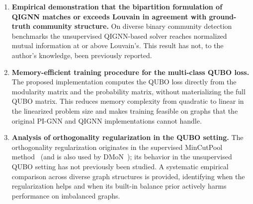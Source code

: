 \begin{enumerate}
    \item \textbf{Empirical demonstration that the bipartition
    formulation of QIGNN matches or exceeds Louvain in agreement
    with ground-truth community structure.} On diverse binary
    community detection benchmarks the unsupervised QIGNN-based
    solver reaches normalized mutual information at or above
    Louvain's. This result has not, to the author's knowledge,
    been previously reported.

    \item \textbf{Memory-efficient training procedure for the
    multi-class QUBO loss.} The proposed implementation computes
    the QUBO loss directly from the modularity matrix and the
    probability matrix, without materializing the full QUBO
    matrix. This reduces memory complexity from quadratic to
    linear in the linearized problem size and makes training
    feasible on graphs that the original PI-GNN and QIGNN
    implementations cannot handle.

    \item \textbf{Analysis of orthogonality regularization in the
    QUBO setting.} The orthogonality regularization originates in
    the supervised MinCutPool method~\cite{bianchi2020spectral}
    (and is also used by DMoN~\cite{tsitsulin2020graph}); its
    behavior in the unsupervised QUBO setting has not previously
    been studied. A systematic empirical comparison across diverse
    graph structures is provided, identifying when the
    regularization helps and when its built-in balance prior
    actively harms performance on imbalanced graphs.
\end{enumerate}


\newpage